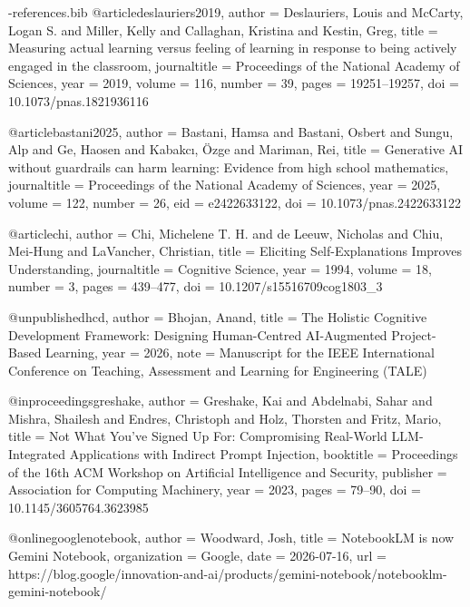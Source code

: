 \begin{filecontents*}[overwrite]{\jobname-references.bib}
@article{deslauriers2019,
 author = {Deslauriers, Louis and McCarty, Logan S. and Miller, Kelly and Callaghan, Kristina and Kestin, Greg},
 title = {{Measuring actual learning versus feeling of learning in response to being actively engaged in the classroom}},
 journaltitle = {Proceedings of the National Academy of Sciences},
 year = {2019},
 volume = {116},
 number = {39},
 pages = {19251--19257},
 doi = {10.1073/pnas.1821936116}
}

@article{bastani2025,
 author = {Bastani, Hamsa and Bastani, Osbert and Sungu, Alp and Ge, Haosen and Kabakc{\i}, {\"O}zge and Mariman, Rei},
 title = {{Generative AI without guardrails can harm learning: Evidence from high school mathematics}},
 journaltitle = {Proceedings of the National Academy of Sciences},
 year = {2025},
 volume = {122},
 number = {26},
 eid = {e2422633122},
 doi = {10.1073/pnas.2422633122}
}

@article{chi,
 author = {Chi, Michelene T. H. and de Leeuw, Nicholas and Chiu, Mei-Hung and LaVancher, Christian},
 title = {{Eliciting Self-Explanations Improves Understanding}},
 journaltitle = {Cognitive Science},
 year = {1994},
 volume = {18},
 number = {3},
 pages = {439--477},
 doi = {10.1207/s15516709cog1803_3}
}

@unpublished{hcd,
 author = {Bhojan, Anand},
 title = {{The Holistic Cognitive Development Framework: Designing Human-Centred AI-Augmented Project-Based Learning}},
 year = {2026},
 note = {Manuscript for the IEEE International Conference on Teaching, Assessment and Learning for Engineering (TALE)}
}

@inproceedings{greshake,
 author = {Greshake, Kai and Abdelnabi, Sahar and Mishra, Shailesh and Endres, Christoph and Holz, Thorsten and Fritz, Mario},
 title = {{Not What You've Signed Up For: Compromising Real-World LLM-Integrated Applications with Indirect Prompt Injection}},
 booktitle = {Proceedings of the 16th ACM Workshop on Artificial Intelligence and Security},
 publisher = {Association for Computing Machinery},
 year = {2023},
 pages = {79--90},
 doi = {10.1145/3605764.3623985}
}

@online{googlenotebook,
 author = {Woodward, Josh},
 title = {{NotebookLM is now Gemini Notebook}},
 organization = {Google},
 date = {2026-07-16},
 url = {https://blog.google/innovation-and-ai/products/gemini-notebook/notebooklm-gemini-notebook/}
}
\end{filecontents*}

